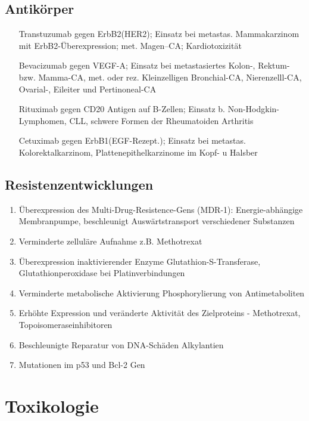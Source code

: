 \documentclass[10pt,a4paper]{report}
\begin{document}
\section{Antikörper} %
\label{sec:antik_rper}
\begin{itemize}
	\item[Transtuzumab] gegen ErbB2(HER2); Einsatz bei metastas. Mammakarzinom mit ErbB2-Überexpression; met. Magen–CA; Kardiotoxizität 
	\item[Bevacizumab] gegen VEGF-A; Einsatz bei metastasiertes Kolon-, Rektum-bzw. Mamma-CA, met. oder rez. Kleinzelligen Bronchial-CA, Nierenzelll-CA, Ovarial-, Eileiter und Pertinoneal-CA
	\item[Rituximab] gegen CD20 Antigen auf B-Zellen; Einsatz b. Non-Hodgkin-Lymphomen, CLL, schwere Formen der Rheumatoiden Arthritis
	\item[Cetuximab] gegen ErbB1(EGF-Rezept.); Einsatz bei metastas. Kolorektalkarzinom, Plattenepithelkarzinome im Kopf- u Halsber 
\end{itemize}

\section{Resistenzentwicklungen} %
\label{sec:resistenzentwicklungen}
\begin{enumerate}
	\item Überexpression des Multi-Drug-Resistence-Gens (MDR-1): Energie-abhängige Membranpumpe, beschleunigt Auswärtstransport verschiedener Substanzen
	\item Verminderte zelluläre Aufnahme  z.B. Methotrexat
	\item Überexpression inaktivierender Enzyme Glutathion-S-Transferase, Glutathionperoxidase bei Platinverbindungen
	\item Verminderte metabolische Aktivierung Phosphorylierung von Antimetaboliten
	\item Erhöhte Expression und veränderte Aktivität des Zielproteins - Methotrexat, Topoisomeraseinhibitoren
	\item Beschleunigte Reparatur von DNA-Schäden  Alkylantien
	\item Mutationen im p53 und Bcl-2 Gen
\end{enumerate}
\chapter{Toxikologie} %
\label{cha:toxikologie}
\end{document}
